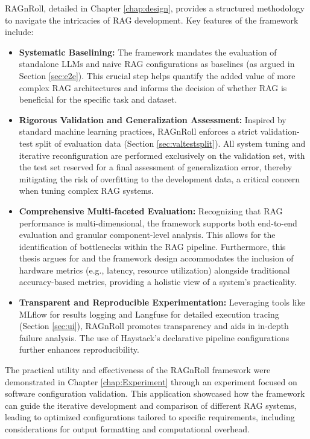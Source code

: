 RAGnRoll, detailed in Chapter \ref{chap:design}, provides a structured methodology to navigate the intricacies of RAG development. Key features of the framework include:
\begin{itemize}
    \item \textbf{Systematic Baselining:} The framework mandates the evaluation of standalone LLMs and naive RAG configurations as baselines (as argued in Section \ref{sec:e2e}). This crucial step helps quantify the added value of more complex RAG architectures and informs the decision of whether RAG is beneficial for the specific task and dataset.
    \item \textbf{Rigorous Validation and Generalization Assessment:} Inspired by standard machine learning practices, RAGnRoll enforces a strict validation-test split of evaluation data (Section \ref{sec:valtestsplit}). All system tuning and iterative reconfiguration are performed exclusively on the validation set, with the test set reserved for a final assessment of generalization error, thereby mitigating the risk of overfitting to the development data, a critical concern when tuning complex RAG systems.
    \item \textbf{Comprehensive Multi-faceted Evaluation:} Recognizing that RAG performance is multi-dimensional, the framework supports both end-to-end evaluation and granular component-level analysis. This allows for the identification of bottlenecks within the RAG pipeline. Furthermore, this thesis argues for and the framework design accommodates the inclusion of hardware metrics (e.g., latency, resource utilization) alongside traditional accuracy-based metrics, providing a holistic view of a system's practicality.
    \item \textbf{Transparent and Reproducible Experimentation:} Leveraging tools like MLflow for results logging and Langfuse for detailed execution tracing (Section \ref{sec:ui}), RAGnRoll promotes transparency and aids in in-depth failure analysis. The use of Haystack's declarative pipeline configurations further enhances reproducibility.
\end{itemize}

The practical utility and effectiveness of the RAGnRoll framework were demonstrated in Chapter \ref{chap:Experiment} through an experiment focused on software configuration validation. This application showcased how the framework can guide the iterative development and comparison of different RAG systems, leading to optimized configurations tailored to specific requirements, including considerations for output formatting and computational overhead.

